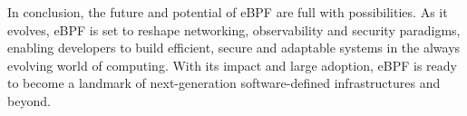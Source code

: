 In conclusion, the future and potential of eBPF are full with possibilities. 
As it evolves, eBPF is set to reshape networking, observability and security paradigms, enabling developers to build efficient, secure and adaptable systems in the always evolving world of computing. 
With its impact and large adoption, eBPF is ready to become a landmark of next-generation software-defined infrastructures and beyond.

